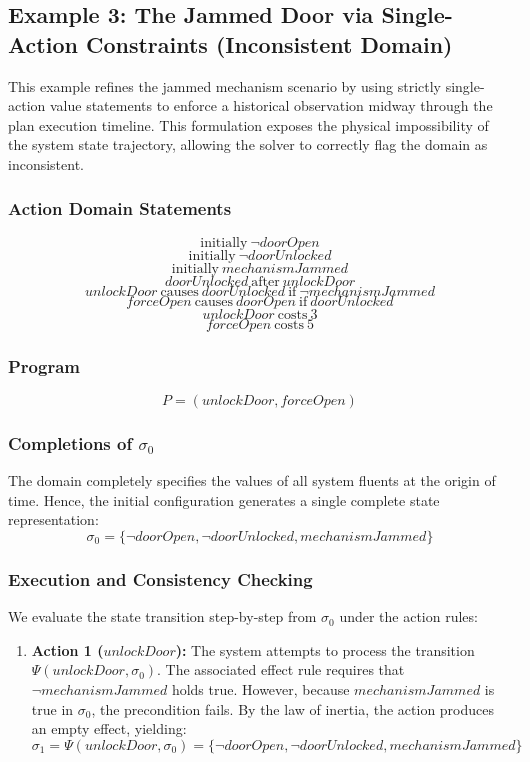 \documentclass[11pt]{article}
\begin{document}
\subsection{Example 3: The Jammed Door via Single-Action Constraints (Inconsistent Domain)}
This example refines the jammed mechanism scenario by using strictly single-action value statements to enforce a historical observation midway through the plan execution timeline. This formulation exposes the physical impossibility of the system state trajectory, allowing the solver to correctly flag the domain as inconsistent.

\subsubsection{Action Domain Statements}
\[
\text{initially}~ \neg doorOpen
\]
\[
\text{initially}~ \neg doorUnlocked
\]
\[
\text{initially}~ mechanismJammed
\]
\[
doorUnlocked ~\text{after}~ unlockDoor
\]
\[
unlockDoor ~\text{causes}~ doorUnlocked ~\text{if}~ \neg mechanismJammed
\]
\[
forceOpen ~\text{causes}~ doorOpen ~\text{if}~ doorUnlocked
\]
\[
unlockDoor ~\text{costs}~ 3
\]
\[
forceOpen ~\text{costs}~ 5
\]

\subsubsection{Program}
\[
P = (unlockDoor, forceOpen)
\]

\subsubsection{Completions of $\sigma_0$}
The domain completely specifies the values of all system fluents at the origin of time. Hence, the initial configuration generates a single complete state representation:
\[
\sigma_0 = \{\neg doorOpen, \neg doorUnlocked, mechanismJammed\}
\]

\subsubsection{Execution and Consistency Checking}
We evaluate the state transition step-by-step from $\sigma_0$ under the action rules:
\begin{enumerate}
    \item \textbf{Action 1 ($unlockDoor$):} The system attempts to process the transition $\Psi(unlockDoor, \sigma_0)$. The associated effect rule requires that $\neg mechanismJammed$ holds true. However, because $mechanismJammed$ is true in $\sigma_0$, the precondition fails. By the law of inertia, the action produces an empty effect, yielding:
    \[ \sigma_1 = \Psi(unlockDoor, \sigma_0) = \{\neg doorOpen, \neg doorUnlocked, mechanismJammed\} \]
\end{enumerate}
\end{document}
